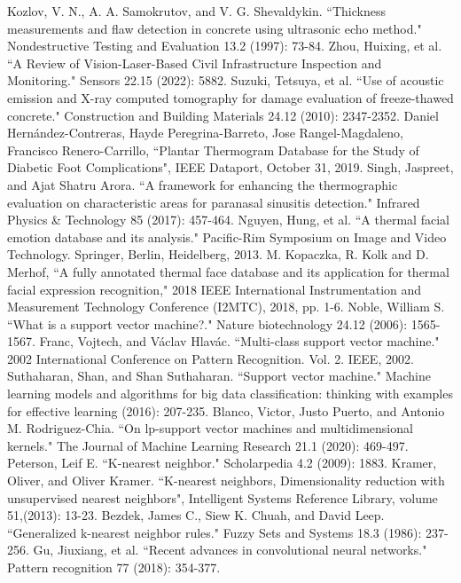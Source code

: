\begin{thebibliography}{00}
 Kozlov, V. N., A. A. Samokrutov, and V. G. Shevaldykin. ``Thickness measurements and flaw detection in concrete using ultrasonic echo method." Nondestructive Testing and Evaluation 13.2 (1997): 73-84.
 Zhou, Huixing, et al. ``A Review of Vision-Laser-Based Civil Infrastructure Inspection and Monitoring." Sensors 22.15 (2022): 5882.
 Suzuki, Tetsuya, et al. ``Use of acoustic emission and X-ray computed tomography for damage evaluation of freeze-thawed concrete." Construction and Building Materials 24.12 (2010): 2347-2352.
 Daniel Hernández-Contreras, Hayde Peregrina-Barreto, Jose Rangel-Magdaleno, Francisco Renero-Carrillo, ``Plantar Thermogram Database for the Study of Diabetic Foot Complications", IEEE Dataport, October 31, 2019.
 Singh, Jaspreet, and Ajat Shatru Arora. ``A framework for enhancing the thermographic evaluation on characteristic areas for paranasal sinusitis detection." Infrared Physics \& Technology 85 (2017): 457-464.
 Nguyen, Hung, et al. ``A thermal facial emotion database and its analysis." Pacific-Rim Symposium on Image and Video Technology. Springer, Berlin, Heidelberg, 2013.
 M. Kopaczka, R. Kolk and D. Merhof, ``A fully annotated thermal face database and its application for thermal facial expression recognition," 2018 IEEE International Instrumentation and Measurement Technology Conference (I2MTC), 2018, pp. 1-6.
 Noble, William S. ``What is a support vector machine?." Nature biotechnology 24.12 (2006): 1565-1567.
 Franc, Vojtech, and Václav Hlavác. ``Multi-class support vector machine." 2002 International Conference on Pattern Recognition. Vol. 2. IEEE, 2002.
 Suthaharan, Shan, and Shan Suthaharan. ``Support vector machine." Machine learning models and algorithms for big data classification: thinking with examples for effective learning (2016): 207-235.
 Blanco, Victor, Justo Puerto, and Antonio M. Rodriguez-Chia. ``On lp-support vector machines and multidimensional kernels." The Journal of Machine Learning Research 21.1 (2020): 469-497.
 Peterson, Leif E. ``K-nearest neighbor." Scholarpedia 4.2 (2009): 1883.
 Kramer, Oliver, and Oliver Kramer. ``K-nearest neighbors, Dimensionality reduction with unsupervised nearest neighbors", Intelligent Systems Reference Library, volume 51,(2013): 13-23.
 Bezdek, James C., Siew K. Chuah, and David Leep. ``Generalized k-nearest neighbor rules." Fuzzy Sets and Systems 18.3 (1986): 237-256.
 Gu, Jiuxiang, et al. ``Recent advances in convolutional neural networks." Pattern recognition 77 (2018): 354-377.

\end{thebibliography}
